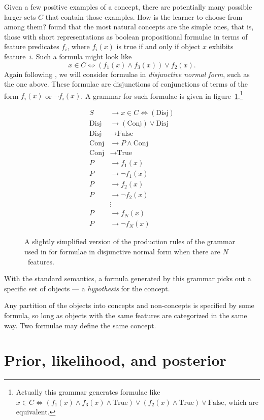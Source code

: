 \documentclass[jou,apacite]{apa6}
\newcommand{\Disj}{\text{Disj}}
\newcommand{\Conj}{\text{Conj}}
\newcommand{\True}{\text{True}}
\newcommand{\False}{\text{False}}
\begin{document}
Given a few positive examples of a concept, there are potentially
many possible larger sets $C$ that contain those examples. How is the
learner to choose from among them? \citet{feldman} found that the most
natural concepts are the simple ones, that is, those with short
representations as boolean propositional formulae in terms of feature
predicates $f_i$, where $f_i(x)$ is true if and only if object $x$
exhibits feature~$i$. Such a formula might look like
\[ x\in C \Leftrightarrow(f_1(x)\wedge f_3(x)) \vee f_2(x).  \]
Again following \citet{rrdnf}, we will consider formulae in
\emph{disjunctive normal form}, such as the one above.
 These formulae are disjunctions
of conjunctions of terms of the form $f_i(x)$ or $\neg f_i(x)$.
A grammar for such formulae is given in 
figure~\ref{dnf1}.\footnote{Actually this grammar generates formulae like
$ x\in C \Leftrightarrow
(f_1(x)\wedge f_3(x)\wedge\True) \vee (f_2(x)\wedge\True)\vee\False$,
which are equivalent.}
\begin{figure}
\begin{align*}
	S &\to x\in C \Leftrightarrow (\Disj)\\
	\Disj &\to (\Conj) \vee \Disj \\
	\Disj &\to \False \\
	\Conj &\to P \wedge \Conj\\
	\Conj &\to \True\\
	P &\to f_1(x)\\
	P &\to \neg f_1(x)\\
	P &\to f_2(x)\\
	P &\to \neg f_2(x)\\
	&\vdots\\
	P &\to f_N(x)\\
	P &\to \neg f_N(x)
\end{align*}
	\caption{A slightly simplified version
		of the production rules of the
		grammar used in \citet{rrdnf}
		 for formulae in disjunctive normal form
		when there are $N$~features.}
	\label{dnf1}
\end{figure}
With the standard semantics, a formula generated by this grammar
picks out a specific set of objects --- a \emph{hypothesis}
for the concept.

Any partition of the objects into concepts and non-concepts
is specified by some formula, so long as objects with the same 
features are categorized in the same way. Two formulae may define the
same concept.

\section{Prior, likelihood, and posterior}
\end{document}
